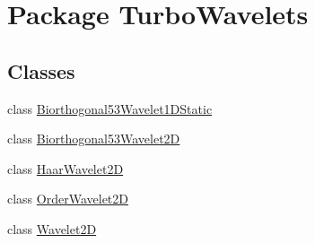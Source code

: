 \hypertarget{namespace_turbo_wavelets}{\section{\-Package \-Turbo\-Wavelets}
\label{namespace_turbo_wavelets}
}
\subsection*{\-Classes}
\begin{DoxyCompactItemize}
\item 
class \hyperlink{class_turbo_wavelets_1_1_biorthogonal53_wavelet1_d_static}{\-Biorthogonal53\-Wavelet1\-D\-Static}
\item 
class \hyperlink{class_turbo_wavelets_1_1_biorthogonal53_wavelet2_d}{\-Biorthogonal53\-Wavelet2\-D}
\item 
class \hyperlink{class_turbo_wavelets_1_1_haar_wavelet2_d}{\-Haar\-Wavelet2\-D}
\item 
class \hyperlink{class_turbo_wavelets_1_1_order_wavelet2_d}{\-Order\-Wavelet2\-D}
\item 
class \hyperlink{class_turbo_wavelets_1_1_wavelet2_d}{\-Wavelet2\-D}
\end{DoxyCompactItemize}

